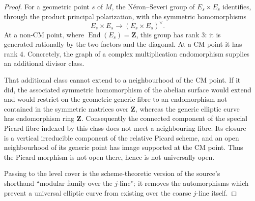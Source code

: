 \begin{proof}
For a geometric point $s$ of $M$, the N\'eron--Severi group of
$E_s\times E_s$ identifies, through the product principal polarization, with
the symmetric homomorphisms
$$
E_s\times E_s \longrightarrow (E_s\times E_s)^\vee.
$$
At a non-CM point, where $\operatorname{End}(E_s)=\mathbf{Z}$, this group has
rank $3$:
it is generated rationally by the two factors and the diagonal. At a CM
point it has rank $4$. Concretely, the graph of a complex multiplication
endomorphism supplies an additional divisor class.

That additional class cannot extend to a neighbourhood of the CM point. If
it did, the associated symmetric homomorphism of the abelian surface would
extend and would restrict on the geometric generic fibre to an endomorphism
not contained in the symmetric matrices over $\mathbf{Z}$, whereas the
generic elliptic curve has endomorphism ring $\mathbf{Z}$. Consequently the
connected component of the special Picard fibre indexed by this class does
not meet a neighbouring fibre. Its closure is a vertical irreducible
component of the relative Picard scheme, and an open neighbourhood of its
generic point has image supported at the CM point. Thus the Picard morphism
is not open there, hence is not universally open.

Passing to the level cover is the scheme-theoretic version of the source's
shorthand ``modular family over the $j$-line''; it removes the automorphisms
which prevent a universal elliptic curve from existing over the coarse
$j$-line itself.
\end{proof}

